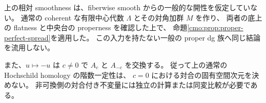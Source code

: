 \begin{remark}[相対化と対合付き比較の区別]
上の相対 smoothness は、fiberwise smooth からの一般的な開性を仮定していない。
通常の coherent な有限中心代数 $\Lambda$ とその対角加群 $M$ を作り、
両者の底上の flatness と中央台の properness を確認した上で、
命題\ref{cmo:prop:proper-perfect-spread}を適用した。
この入力を持たない一般の proper dg 族へ同じ結論を流用しない。

また、$u\mapsto-u$ は $c\ne0$ で $A_c$ と $A_{-c}$ を交換する。
従って上の通常の Hochschild homology の階数一定性は、
$c=0$ における対合の固有空間次元を決めない。
非可換側の対合付き不変量には独立の計算または同変比較が必要である。
\end{remark}
